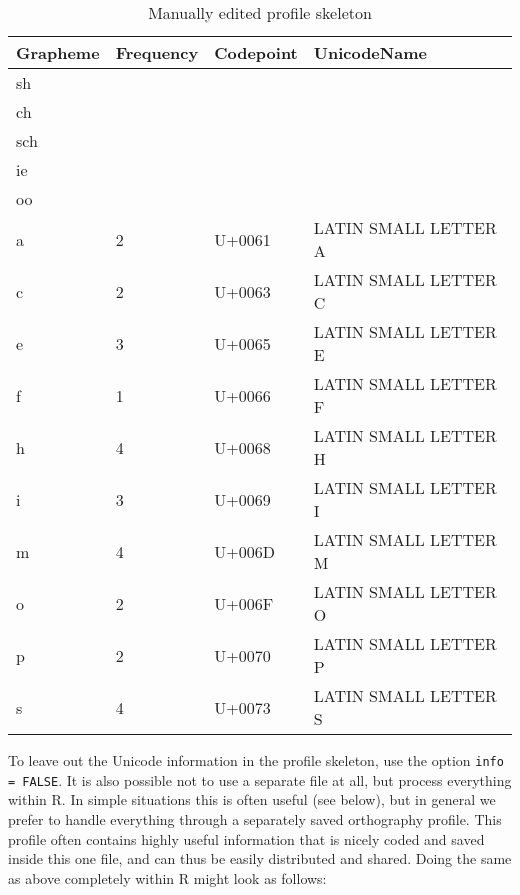 \documentclass[output=inprep,
		biblatex
		]{LSP/langsci}\usepackage[]{graphicx}\usepackage[]{color}
\begin{document}
\begin{table}[htb]
\centering
\begingroup\scriptsize
\begin{tabular}{llll}
  \toprule
Grapheme & Frequency & Codepoint & UnicodeName \\ 
  \midrule
sh &  &  &  \\ 
  ch &  &  &  \\ 
  sch &  &  &  \\ 
  ie &  &  &  \\ 
  oo &  &  &  \\ 
  a & 2 & U+0061 & LATIN SMALL LETTER A \\ 
  c & 2 & U+0063 & LATIN SMALL LETTER C \\ 
  e & 3 & U+0065 & LATIN SMALL LETTER E \\ 
  f & 1 & U+0066 & LATIN SMALL LETTER F \\ 
  h & 4 & U+0068 & LATIN SMALL LETTER H \\ 
  i & 3 & U+0069 & LATIN SMALL LETTER I \\ 
  m & 4 & U+006D & LATIN SMALL LETTER M \\ 
  o & 2 & U+006F & LATIN SMALL LETTER O \\ 
  p & 2 & U+0070 & LATIN SMALL LETTER P \\ 
  s & 4 & U+0073 & LATIN SMALL LETTER S \\ 
   \bottomrule
\end{tabular}
\endgroup
\caption{Manually edited profile skeleton} 
\label{tab:profile_skeleton1}
\end{table}


To leave out the Unicode information in
the profile skeleton, use the option \texttt{info = FALSE}. It is also
possible not to use a separate file at all, but process everything within R. In
simple situations this is often useful (see below), but in general we prefer to
handle everything through a separately saved orthography profile. This profile
often contains highly useful information that is nicely coded and saved inside
this one file, and can thus be easily distributed and shared. Doing the same as
above completely within R might look as follows:
\end{document}
